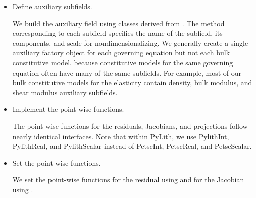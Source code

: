 \begin{itemize}
\item Define auxiliary subfields.

  We build the auxiliary field using classes derived from
  . The method
  corresponding to each subfield specifies the name of the subfield,
  its components, and scale for nondimensionalizing. We generally
  create a single auxiliary factory object for each governing equation
  but not each bulk constitutive model, because constitutive models
  for the same governing equation often have many of the same
  subfields. For example, most of our bulk constitutive models for the
  elasticity contain density, bulk modulus, and shear modulus
  auxiliary subfields.


\item Implement the point-wise functions.

  The point-wise functions for the residuals, Jacobians, and
  projections follow nearly identical interfaces. Note that within
  PyLith, we use PylithInt, PylithReal, and PylithScalar instead of
  PetscInt, PetscReal, and PetscScalar.

\item Set the point-wise functions.

  We set the point-wise functions for the residual using
   and for the Jacobian using
  .

\end{itemize}

